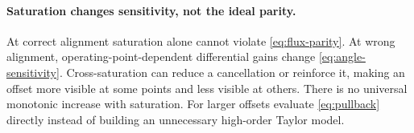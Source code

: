 \paragraph{Saturation changes sensitivity, not the ideal parity.}
At correct alignment saturation alone cannot violate \cref{eq:flux-parity}.
At wrong alignment, operating-point-dependent differential gains change
\cref{eq:angle-sensitivity}. Cross-saturation can reduce a cancellation or
reinforce it, making an offset more visible at some points and less visible
at others. There is no universal monotonic increase with saturation.
For larger offsets evaluate \cref{eq:pullback} directly instead of building
an unnecessary high-order Taylor model.
